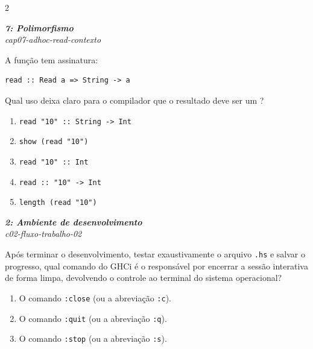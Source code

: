 \documentclass[a4paper,10pt,brazil]{article}
\begin{document}
\begin{multicols}{2}
\begin{flushright}
  \footnotesize
  \textit{\textbf{7: Polimorfismo}}\\
  \textit{cap07-adhoc-read-contexto}\\

\end{flushright}
A função  tem assinatura:

\begin{verbatim}
read :: Read a => String -> a
\end{verbatim}

Qual uso deixa claro para o compilador que o resultado deve ser um ?

\begin{enumerate}
  \item \texttt{read "10" :: String -> Int}
  \item \texttt{show (read "10")}
  \item \texttt{read "10" :: Int}
  \item \texttt{read :: "10" -> Int}
  \item \texttt{length (read "10")}

\end{enumerate}

\begin{flushright}
  \footnotesize
  \textit{\textbf{2: Ambiente de desenvolvimento}}\\
  \textit{c02-fluxo-trabalho-02}\\

\end{flushright}
Após terminar o desenvolvimento, testar exaustivamente o arquivo \texttt{.hs} e salvar o progresso, qual comando do GHCi é o responsável por encerrar a sessão interativa de forma limpa, devolvendo o controle ao terminal do sistema operacional?

\begin{enumerate}
  \item O comando \texttt{:close} (ou a abreviação \texttt{:c}).

  \item O comando \texttt{:quit} (ou a abreviação \texttt{:q}).

  \item O comando \texttt{:stop} (ou a abreviação \texttt{:s}).


\end{enumerate}
\end{multicols}
\end{document}
